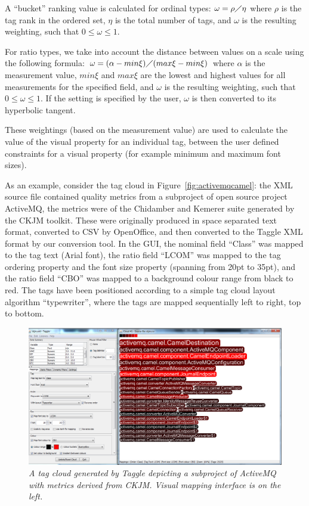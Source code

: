 A ``bucket'' ranking value is calculated for ordinal types: $\omega=\rho\diagup\eta$ where $\rho$ is the tag rank in the ordered set, $\eta$ is the total number of tags, and $\omega$ is the resulting weighting, such that $0 \leq \omega \leq 1$. 

For ratio types, we take into account the distance between values on a scale using the following formula: $\omega=(\alpha-min\xi)\diagup (max\xi - min\xi)$ where $\alpha$ is the measurement value, $min\xi$ and $max\xi$ are the lowest and highest values for all measurements for the specified field, and $\omega$ is the resulting weighting, such that $0 \leq \omega \leq 1$. If the setting is specified by the user, $\omega$ is then converted to its hyperbolic tangent. 

These weightings (based on the measurement value) are used to calculate the value of the visual property for an individual tag, between the user defined constraints for a visual property (for example minimum and maximum font sizes).

As an example, consider the tag cloud in Figure~\vref{fig:activemqcamel}: the XML source file contained quality metrics from a subproject of open source project  ActiveMQ, the metrics were of the Chidamber and Kemerer suite generated by the CKJM toolkit. These were originally produced in space separated text format, converted to CSV by OpenOffice, and then converted to the Taggle XML format by our conversion tool. In the GUI, the nominal field ``Class'' was mapped to the tag text (Arial font), the ratio field ``LCOM'' was mapped to the tag ordering property and the font size property (spanning from 20pt to 35pt), and the ratio field ``CBO'' was mapped to a background colour range from black to red. The tags have been positioned according to a simple tag cloud layout algorithm ``typewriter'', where the tags are mapped sequentially left to right, top to bottom.

\begin{figure} [h!]
  	\centering
   	\includegraphics{activemqcamel.png}
  	\caption{\textit{A tag cloud generated by Taggle depicting a subproject of ActiveMQ with metrics derived from CKJM. Visual mapping interface is on the left.}}
	\label{fig:activemqcamel}
\end{figure}

